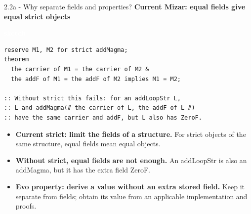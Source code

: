\documentclass[aspectratio=169,11pt]{beamer}
\newcommand{\statusbadge}[2]{\colorbox{#1}{\textcolor{white}{\strut\scriptsize\sffamily\bfseries #2}}}
\newcommand{\badgeSketch}{\statusbadge{orange!75!black}{sketch}}
\begin{document}
\begin{frame}[fragile,t]{2.2a - Why separate fields and properties?}
\smallskip
\textbf{Current Mizar: equal fields give equal strict objects}~\badgeSketch
\begin{lstlisting}[language={mizar},basicstyle=\ttfamily\footnotesize]
reserve M1, M2 for strict addMagma;
theorem
  the carrier of M1 = the carrier of M2 &
  the addF of M1 = the addF of M2 implies M1 = M2;

:: Without strict this fails: for an addLoopStr L,
:: L and addMagma(# the carrier of L, the addF of L #)
:: have the same carrier and addF, but L also has ZeroF.
\end{lstlisting}
\begin{itemize}
\setlength{\itemsep}{1pt}
\setlength{\parsep}{0pt}
\setlength{\parskip}{0pt}
\item \textcolor{blue!55!black}{\textbf{Current strict: limit the fields of a structure.}} For strict objects of the same structure, equal fields mean equal objects.
\item \textcolor{blue!55!black}{\textbf{Without strict, equal fields are not enough.}} An addLoopStr is also an addMagma, but it has the extra field ZeroF.
\item \textcolor{blue!55!black}{\textbf{Evo property: derive a value without an extra stored field.}} Keep it separate from fields; obtain its value from an applicable implementation and proofs.
\end{itemize}
\end{frame}
\end{document}
